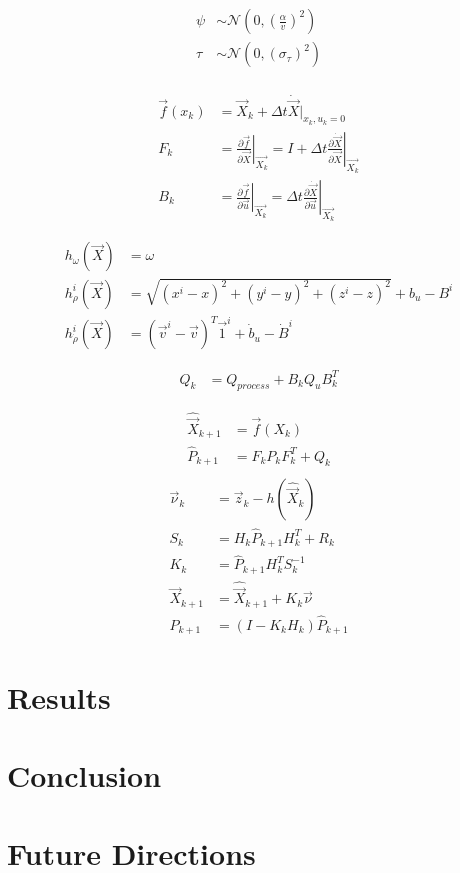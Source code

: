 \documentclass[letterpaper,times]{IONconf}
\begin{document}
\begin{align*}
    \psi &\sim \mathcal{N}\left(0,\left(\frac{ \alpha }{v }\right)^2\right)\\
    \tau &\sim \mathcal{N}\left(0,\left(\sigma_\tau \right)^2\right)\\
\end{align*}

\begin{align*}
    \vec{f}(x_k) &= \vec{X}_{k} + \Delta t \dot{\vec{X}}|_{x_k,u_k=0}\\
    F_k &= \left. \frac{ \partial\vec{f}}{\partial \vec{X}}\right\vert_{\vec{X_{k}}} = I + \Delta t \left.\frac{ \partial \dot{\vec{X}}}{\partial \vec{X} }\right\vert_{\vec{X_k}}\\
    B_k &= \left. \frac{ \partial\vec{f}}{\partial \vec{u}}\right\vert_{\vec{X_{k}}} = \Delta t \left.\frac{ \partial \dot{\vec{X}}}{\partial \vec{u} }\right\vert_{\vec{X_k}}
\end{align*}

\begin{align*}
    h_ \omega(\vec{X}) &= \omega \\
    h^i_ \rho(\vec{X}) &= \sqrt{ (x^i-x)^2 + (y^i-y)^2 + (z^i-z)^2} + b_u - B^i\\
    h^i_ {\dot{\rho}}(\vec{X}) &= (\vec{v}^i-\vec{v})^T \vec{1}^i + \dot{b}_u - \dot{B}^i
\end{align*}

\begin{align*}
    Q_k &= Q_{process} + B_k Q_{u} B_k^T
\end{align*}

\begin{align*}
    \hat{\vec{X}}_{k+1} &= \vec{f}(X_k) \\
    \hat{P}_{k+1} &= F_k P_k F_k^T + Q_k\\
\end{align*}
\begin{align*}
    \vec{\nu}_k &= \vec{z}_k - h(\hat{\vec{X}}_k) \\
    S_k &= H_k \hat{P}_{k+1} H_k^T + R_k\\
    K_k &= \hat{P}_{k+1} H_k^T S_k^{-1}\\
    \vec{X}_{k+1} &= \hat{\vec{X}}_{k+1} + K_k \vec{\nu}\\
    {P}_{k+1} &= (I-K_k H_k)\hat{P}_{k+1}
\end{align*}

\section{Results}

\section{Conclusion}

\section{Future Directions}

%
\end{document}
